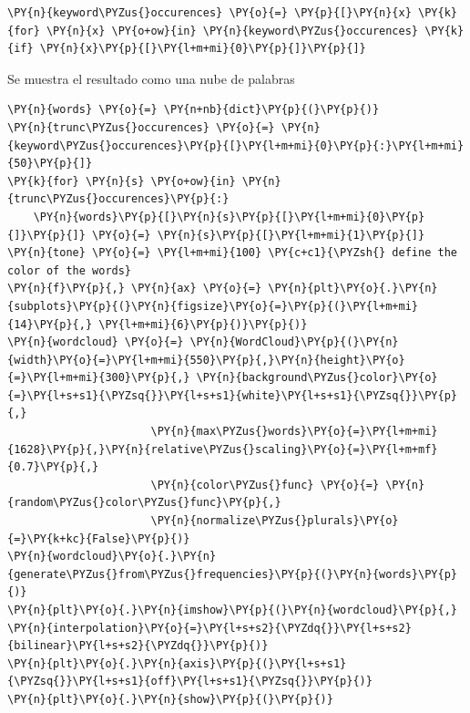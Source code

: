     \begin{tcolorbox}[breakable, size=fbox, boxrule=1pt, pad at break*=1mm,colback=cellbackground, colframe=cellborder]
\begin{Verbatim}[commandchars=\\\{\}]
\PY{n}{keyword\PYZus{}occurences} \PY{o}{=} \PY{p}{[}\PY{n}{x} \PY{k}{for} \PY{n}{x} \PY{o+ow}{in} \PY{n}{keyword\PYZus{}occurences} \PY{k}{if} \PY{n}{x}\PY{p}{[}\PY{l+m+mi}{0}\PY{p}{]}\PY{p}{]}
\end{Verbatim}
\end{tcolorbox}

    Se muestra el resultado como una nube de palabras

    \begin{tcolorbox}[breakable, size=fbox, boxrule=1pt, pad at break*=1mm,colback=cellbackground, colframe=cellborder]
\begin{Verbatim}[commandchars=\\\{\}]
\PY{n}{words} \PY{o}{=} \PY{n+nb}{dict}\PY{p}{(}\PY{p}{)}
\PY{n}{trunc\PYZus{}occurences} \PY{o}{=} \PY{n}{keyword\PYZus{}occurences}\PY{p}{[}\PY{l+m+mi}{0}\PY{p}{:}\PY{l+m+mi}{50}\PY{p}{]}
\PY{k}{for} \PY{n}{s} \PY{o+ow}{in} \PY{n}{trunc\PYZus{}occurences}\PY{p}{:}
    \PY{n}{words}\PY{p}{[}\PY{n}{s}\PY{p}{[}\PY{l+m+mi}{0}\PY{p}{]}\PY{p}{]} \PY{o}{=} \PY{n}{s}\PY{p}{[}\PY{l+m+mi}{1}\PY{p}{]}
\PY{n}{tone} \PY{o}{=} \PY{l+m+mi}{100} \PY{c+c1}{\PYZsh{} define the color of the words}
\PY{n}{f}\PY{p}{,} \PY{n}{ax} \PY{o}{=} \PY{n}{plt}\PY{o}{.}\PY{n}{subplots}\PY{p}{(}\PY{n}{figsize}\PY{o}{=}\PY{p}{(}\PY{l+m+mi}{14}\PY{p}{,} \PY{l+m+mi}{6}\PY{p}{)}\PY{p}{)}
\PY{n}{wordcloud} \PY{o}{=} \PY{n}{WordCloud}\PY{p}{(}\PY{n}{width}\PY{o}{=}\PY{l+m+mi}{550}\PY{p}{,}\PY{n}{height}\PY{o}{=}\PY{l+m+mi}{300}\PY{p}{,} \PY{n}{background\PYZus{}color}\PY{o}{=}\PY{l+s+s1}{\PYZsq{}}\PY{l+s+s1}{white}\PY{l+s+s1}{\PYZsq{}}\PY{p}{,} 
                      \PY{n}{max\PYZus{}words}\PY{o}{=}\PY{l+m+mi}{1628}\PY{p}{,}\PY{n}{relative\PYZus{}scaling}\PY{o}{=}\PY{l+m+mf}{0.7}\PY{p}{,}
                      \PY{n}{color\PYZus{}func} \PY{o}{=} \PY{n}{random\PYZus{}color\PYZus{}func}\PY{p}{,}
                      \PY{n}{normalize\PYZus{}plurals}\PY{o}{=}\PY{k+kc}{False}\PY{p}{)}
\PY{n}{wordcloud}\PY{o}{.}\PY{n}{generate\PYZus{}from\PYZus{}frequencies}\PY{p}{(}\PY{n}{words}\PY{p}{)}
\PY{n}{plt}\PY{o}{.}\PY{n}{imshow}\PY{p}{(}\PY{n}{wordcloud}\PY{p}{,} \PY{n}{interpolation}\PY{o}{=}\PY{l+s+s2}{\PYZdq{}}\PY{l+s+s2}{bilinear}\PY{l+s+s2}{\PYZdq{}}\PY{p}{)}
\PY{n}{plt}\PY{o}{.}\PY{n}{axis}\PY{p}{(}\PY{l+s+s1}{\PYZsq{}}\PY{l+s+s1}{off}\PY{l+s+s1}{\PYZsq{}}\PY{p}{)}
\PY{n}{plt}\PY{o}{.}\PY{n}{show}\PY{p}{(}\PY{p}{)}
\end{Verbatim}
\end{tcolorbox}

